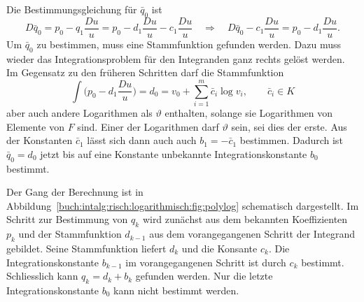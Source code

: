 Die Bestimmungsgleichung für $\bar{q}_0$ ist
\[
D\bar{q}_0
=
p_0 - q_1\frac{Du}{u}
=
p_0 - d_1\frac{Du}{u} - c_1\frac{Du}{u}
\quad\Rightarrow\quad
D\bar{q}_0
-
c_1\frac{Du}{u}
=
p_0 - d_1\frac{Du}{u}.
\]
Um $\bar{q}_0$ zu bestimmen, muss eine Stammfunktion gefunden werden.
Dazu muss wieder das Integrationsproblem für den Integranden ganz rechts
gelöst werden.
Im Gegensatz zu den früheren Schritten darf die Stammfunktion
\[
\int
\biggl(
p_0 - d_1\frac{Du}{u}
\biggr)
=
d_0
=
v_0 + \sum_{i=1}^m \bar{c}_i \log v_i, \qquad \bar{c}_i\in K
\]
aber auch andere Logarithmen als $\vartheta$ enthalten, solange
sie Logarithmen von Elemente von $F$ sind.
Einer der Logarithmen darf $\vartheta$ sein, sei dies der erste.
Aus der Konstanten $\bar{c}_1$ lässt sich dann auch auch
\(
b_1 = -\bar{c}_1
\)
bestimmen.
Dadurch ist $\bar{q}_0=d_0$ jetzt bis auf eine Konstante unbekannte
Integrationskonstante $b_0$ bestimmt.

Der Gang der Berechnung ist in
Abbildung~\ref{buch:intalg:risch:logarithmisch:fig:polylog} 
schematisch dargestellt.
Im Schritt zur Bestimmung von $q_k$ wird zunächst aus dem bekannten
Koeffizienten $p_k$ und der Stammfunktion $d_{k-1}$ aus dem vorangegangenen
Schritt der Integrand gebildet.
Seine Stammfunktion liefert $d_k$ und die Konsante $c_k$.
Die Integrationskonstante $b_{k-1}$ im vorangegangenen Schritt ist
durch $c_k$ bestimmt.
Schliesslich kann $q_k = d_k+b_k$ gefunden werden.
Nur die letzte Integrationskonstante $b_0$ kann nicht bestimmt werden.

